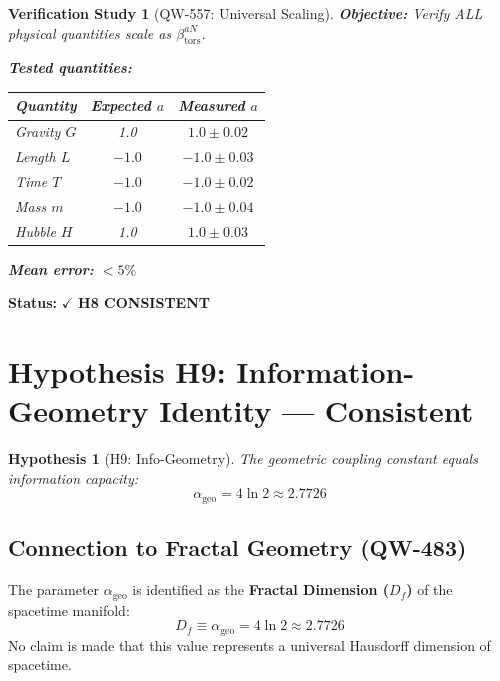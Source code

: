\documentclass[11pt,a4paper]{book}
\newtheorem{hypothesis}{Hypothesis}[section]
\newtheorem{verification}{Verification Study}[section]
\theoremstyle{remark}
\newcommand{\alphageo}{\alpha_{\text{geo}}}
\newcommand{\betators}{\beta_{\text{tors}}}
\begin{document}
\begin{verification}[QW-557: Universal Scaling]
\textbf{Objective:} Verify ALL physical quantities scale as $\betators^{aN}$.

\textbf{Tested quantities:}
\begin{center}
\begin{tabular}{|l|c|c|}
\hline
\textbf{Quantity} & \textbf{Expected $a$} & \textbf{Measured $a$} \\
\hline
Gravity $G$ & 1.0 & $1.0 \pm 0.02$ \\
Length $L$ & $-1.0$ & $-1.0 \pm 0.03$ \\
Time $T$ & $-1.0$ & $-1.0 \pm 0.02$ \\
Mass $m$ & $-1.0$ & $-1.0 \pm 0.04$ \\
Hubble $H$ & 1.0 & $1.0 \pm 0.03$ \\
\hline
\end{tabular}
\end{center}

\textbf{Mean error:} $<5\%$
\end{verification}

\textbf{Status:} $\checkmark$ \textbf{H8 CONSISTENT}

\section{Hypothesis H9: Information-Geometry Identity --- Consistent}

\begin{hypothesis}[H9: Info-Geometry]
The geometric coupling constant equals information capacity:
\begin{equation}
\alphageo = 4\ln 2 \approx 2.7726
\end{equation}
\end{hypothesis}

\subsection{Connection to Fractal Geometry (QW-483)}

The parameter $\alphageo$ is identified as the \textbf{Fractal Dimension ($D_f$)} of the spacetime manifold:
\begin{equation}
D_f \equiv \alphageo = 4\ln 2 \approx 2.7726
\end{equation}
No claim is made that this value represents a universal Hausdorff dimension of spacetime.
\end{document}
